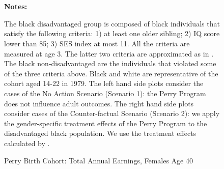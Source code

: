 \begin{figure} \begin{center}\centering
        \caption{Perry Birth Cohort: Total Annual Earnings, Females Age 40}
        \label{female_earn_decile2}\vspace{0.2cm}
          \\
          \\     
\end{center}
{\scriptsize {\bfseries Notes: } \raggedright The black disadvantaged group is composed of black individuals that satisfy the following criteria: 1) at least one older sibling; 2) IQ score lower than 85; 3) SES index at most 11. All the criteria are measured at age 3. The latter two criteria are approximated as in \citet{heckman2010analyzing}. The black non-disadvantaged are the individuals that violated some of the three criteria above. Black and white are representative of the cohort aged 14-22 in 1979. The left hand side plots consider the cases of the No Action Scenario (Scenario 1): the Perry Program does not influence adult outcomes. The right hand side plots consider cases of the Counter-factual Scenario (Scenario 2): we apply the gender-specific treatment effects of the Perry Program to the disadvantaged black population. We use the treatment effects calculated by \citet{heckman2010analyzing}. 
}
\end{figure}



